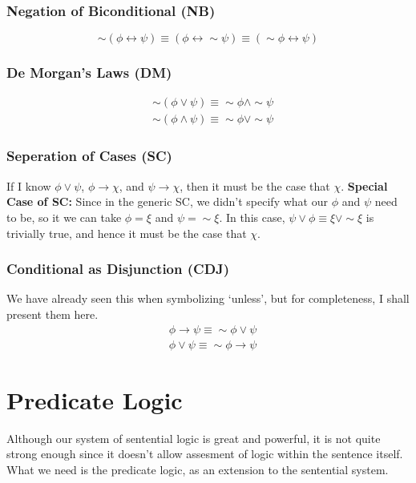 \documentclass[10pt]{article}
\renewcommand{\iff}{\leftrightarrow}
\renewcommand{\implies}{\rightarrow}
\begin{document}
\subsubsection{Negation of Biconditional (NB)}
\begin{equation*}
    \sim (\phi\iff \psi) \equiv (\phi \iff \sim \psi) \equiv (\sim \phi \iff \psi)
\end{equation*}
\subsubsection{De Morgan's Laws (DM)}
\begin{align*}
    &\sim (\phi \vee \psi) \equiv \sim \phi \land \sim \psi \\
    &\sim (\phi \land \psi) \equiv \sim \phi \vee \sim \psi
\end{align*}

\subsubsection{Seperation of Cases (SC)}
If I know $\phi \vee \psi$, $\phi \implies \chi$, and $\psi \implies \chi$, then
it must be the case that $\chi$. \textbf{Special Case of SC:} Since in the generic
SC, we didn't specify what our $\phi$ and $\psi$ need to be, so it we can take $\phi = \xi$
and $\psi = \sim \xi$. In this case, $\psi \vee \phi \equiv \xi \vee \sim \xi$ is
trivially true, and hence it must be the case that $\chi$.

\subsubsection{Conditional as Disjunction (CDJ)}
We have already seen this when symbolizing `unless', but for completeness, I shall
present them here.
\begin{align*}
    &\phi \implies \psi \equiv \sim \phi \vee \psi \\
    &\phi \vee \psi \equiv \sim \phi \implies \psi
\end{align*}

\section{Predicate Logic}
Although our system of sentential logic is great and powerful, it is not quite strong enough since it doesn't allow assesment of logic within the sentence itself. What we need is the predicate logic, as an extension to the sentential system. 
\end{document}
